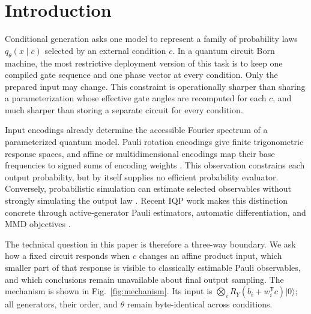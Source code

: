 \documentclass[a4paper,twocolumn,11pt,unpublished]{quantumarticle}
\begin{document}
\section{Introduction}

Conditional generation asks one model to represent a family of probability
laws $q_\theta(x\mid c)$ selected by an external condition $c$.  In a quantum
circuit Born machine, the most restrictive deployment version of this task is
to keep one compiled gate sequence and one phase vector at every condition.
Only the prepared input may change.  This constraint is operationally sharper
than sharing a parameterization whose effective gate angles are recomputed for
each $c$, and much sharper than storing a separate circuit for every
condition.

Input encodings already determine the accessible Fourier spectrum of a
parameterized quantum model.  Pauli rotation encodings give finite
trigonometric response spaces, and affine or multidimensional encodings map
their base frequencies to signed sums of encoding weights
\cite{gilVidalInputRedundancy2020,schuldEffectDataEncoding2021,
casasMultidimensionalFourier2023}.  This observation constrains each output
probability, but by itself supplies no efficient probability evaluator.
Conversely, probabilistic simulation can estimate selected observables without
strongly simulating the output law \cite{nestSimulatingQuantumComputers2011}.
Recent IQP work makes this distinction concrete through active-generator
Pauli estimators, automatic differentiation, and MMD objectives
\cite{recio-armengolIQPoptFastOptimization2025,
recio-armengolTrainClassicalDeploy2026}.

The technical question in this paper is therefore a three-way boundary.  We
ask how a fixed circuit responds when $c$ changes an affine product input,
which smaller part of that response is visible to classically estimable Pauli
observables, and which conclusions remain unavailable about final output
sampling.  The mechanism is shown in Fig.~\ref{fig:mechanism}.  Its input is
$\bigotimes_iR_Y(b_i+w_i^\mathsf{T}c)|0\rangle$; all generators, their order,
and $\theta$ remain byte-identical across conditions.
\end{document}
